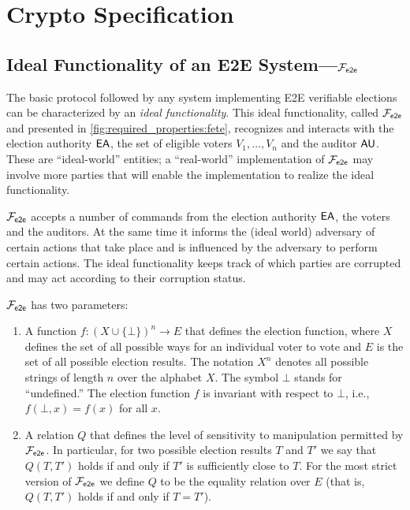 \chapter{Crypto Specification}
\label{chapter:crypto_spec}


\section{Ideal Functionality of an E2E System---$\mathcal{F}_{\mathsf{e2e}}$}
The basic protocol followed by any system implementing E2E verifiable
elections can be characterized by an \emph{ideal functionality}. This
ideal functionality, called $\mathcal{F}_{\mathsf{e2e}}$ and presented in
\autoref{fig:required_properties:fete}, recognizes and interacts with
the election authority $\mathsf{EA}$, the set of eligible voters
$V_1,\ldots, V_n$ and the auditor $\mathsf{AU}$.  These are ``ideal-world''
entities; a ``real-world'' implementation of $\mathcal{F}_{\mathsf{e2e}}$ may involve more
parties that will enable the implementation to realize the ideal
functionality.

$\mathcal{F}_{\mathsf{e2e}}$ accepts a number of commands from the election authority
$\mathsf{EA}$, the voters and the auditors. At the same time it informs the
(ideal world) adversary of certain actions that take place and is
influenced by the adversary to perform certain actions. The ideal
functionality keeps track of which parties are corrupted and may act
according to their corruption status.

$\mathcal{F}_{\mathsf{e2e}}$ has two parameters:

\begin{enumerate}
\item A function $f: (X\cup \{\bot\})^n\rightarrow E$ that defines the
  election function, where $X$ defines the set of all possible ways
  for an individual voter to vote and $E$ is the set of all possible
  election results. The notation $X^n$ denotes all possible strings of
  length $n$ over the alphabet $X$. The symbol $\bot$ stands for
  ``undefined.''  The election function $f$ is invariant with respect
  to $\bot$, i.e., $f(\bot, x) = f(x)$ for all $x$.  
\item A relation $Q$ that defines the level of sensitivity to
  manipulation permitted by $\mathcal{F}_{\mathsf{e2e}}$. In particular, for two possible
  election results $T$ and $T'$ we say that $Q(T,T')$ holds if and
  only if $T'$ is sufficiently close to $T$. For the most strict
  version of $\mathcal{F}_{\mathsf{e2e}}$ we define $Q$ to be the equality relation over
  $E$ (that is, $Q(T,T')$ holds if and only if $T=T'$). 
\end{enumerate}

